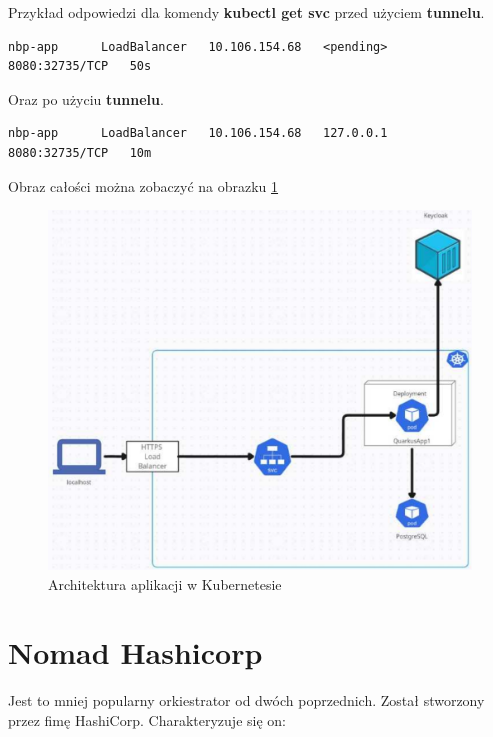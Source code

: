 \documentclass{iiuwb}
\begin{document}
Przykład odpowiedzi dla komendy \textbf{kubectl get svc} przed użyciem \textbf{tunnelu}.

\begin{lstlisting}[breaklines=true]
  nbp-app      LoadBalancer   10.106.154.68   <pending>     8080:32735/TCP   50s

\end{lstlisting}

Oraz po użyciu \textbf{tunnelu}.

\begin{lstlisting}[breaklines=true]
  nbp-app      LoadBalancer   10.106.154.68   127.0.0.1     8080:32735/TCP   10m
\end{lstlisting}

Obraz całości można zobaczyć na obrazku \ref{fig: Architektura aplikacji w Kubernetesie}

\begin{figure}[!h]
\centering
\includegraphics[width=12cm]{kubernetes/AplikacjaKubernetes.pdf}
\caption{Architektura aplikacji w Kubernetesie}
\label{fig: Architektura aplikacji w Kubernetesie}
\end{figure}

\section{Nomad Hashicorp}

Jest to mniej popularny orkiestrator od dwóch poprzednich. Został
stworzony przez fimę HashiCorp. Charakteryzuje się on:
\end{document}
